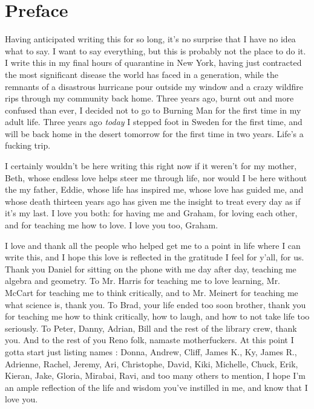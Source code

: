 \documentclass[11pt, a4paper]{article}
\begin{document}
\thispagestyle{empty}
\newpage
\section*{Preface}

Having anticipated writing this for so long, it's no surprise that I have no
idea what to say. I want to say everything, but this is probably not the place
to do it. I write this in my final hours of quarantine in New York, having just
contracted the most significant disease the world has faced in a generation,
while the remnants of a disastrous hurricane pour outside my window and a crazy
wildfire rips through my community back home. Three years ago, burnt out and
more confused than ever, I decided not to go to Burning Man for the first time
in my adult life. Three years ago \emph{today} I stepped foot in Sweden for the
first time, and will be back home in the desert tomorrow for the first time in
two years. Life's a fucking trip.

I certainly wouldn't be here writing this right now if it weren't for my mother,
Beth, whose endless love helps steer me through life, nor would I be here
without the my father, Eddie, whose life has inspired me, whose love has guided
me, and whose death thirteen years ago has given me the insight to treat every
day as if it's my last. I love you both: for having me and Graham, for
loving each other, and for teaching me how to love. I love you too, Graham.

I love and thank all the people who helped get me to a point in life where I can
write this, and I hope this love is reflected in the gratitude I feel for y'all,
for us. Thank you Daniel for sitting on the phone with me day after day,
teaching me algebra and geometry. To Mr. Harris for teaching me to love
learning, Mr. McCart for teaching me to think critically, and to Mr. Meinert for
teaching me what science is, thank you. To Brad, your life ended too soon
brother, thank you for teaching me how to think critically, how to laugh, and
how to not take life too seriously. To Peter, Danny, Adrian, Bill and the rest
of the library crew, thank you. And to the rest of you Reno folk, namaste
motherfuckers. At this point I gotta start just listing names : Donna, Andrew,
Cliff, James K., Ky, James R., Adrienne, Rachel, Jeremy, Ari, Christophe, David,
Kiki, Michelle, Chuck, Erik, Kieran, Jake, Gloria, Mirabai, Ravi, and too many
others to mention, I hope I'm an ample reflection of the life and wisdom you've
instilled in me, and know that I love you.
\end{document}
